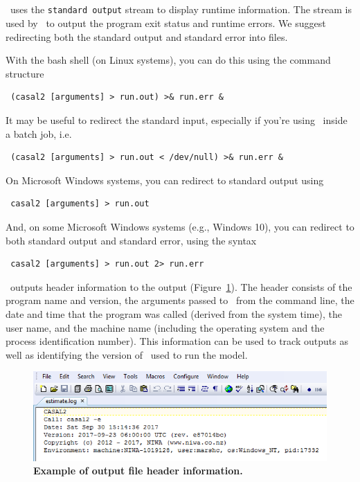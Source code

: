 \subsection{\label{sec:redirecting-stdout}}

\CNAME~uses the \texttt{standard output} stream to display runtime information. The  stream is used by \CNAME~to output the program exit status and runtime errors. We suggest redirecting both the standard output and standard error into files.

With the bash shell (on Linux systems), you can do this using the command structure

\begin{verbatim} (casal2 [arguments] > run.out) >& run.err &\end{verbatim}

It may be useful to redirect the standard input, especially if you're using \CNAME~inside a batch job, i.e.

\begin{verbatim} (casal2 [arguments] > run.out < /dev/null) >& run.err &\end{verbatim}

On Microsoft Windows systems, you can redirect to standard output using

\begin{verbatim} casal2 [arguments] > run.out\end{verbatim}

And, on some Microsoft Windows systems (e.g., Windows 10), you can redirect to both standard output and standard error, using the syntax

\begin{verbatim} casal2 [arguments] > run.out 2> run.err\end{verbatim}

\CNAME~outputs header information to the output (Figure~\ref{fig:log_file_1}). The header consists of the program name and version, the arguments passed to \CNAME~from the command line, the date and time that the program was called (derived from the system time), the user name, and the machine name (including the operating system and the process identification number). This information can be used to track outputs as well as identifying the version of \CNAME~used to run the model.

\begin{figure}[htp]
	\includegraphics[scale=1]{Figures/eglog.png}
	\caption{\textbf{Example of output file header information.}}\label{fig:log_file_1}
\end{figure}

